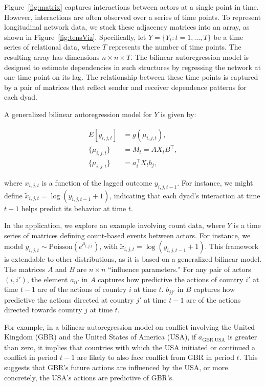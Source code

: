 Figure~\ref{fig:matrix} captures interactions between actors at a single point in time. However, interactions are often observed over a series of time points. To represent longitudinal network data, we stack these adjacency matrices into an array, as shown in Figure~\ref{fig:tensViz}. Specifically, let $Y = \{Y_t : t = 1, \ldots, T\}$ be a time series of relational data, where $T$ represents the number of time points. The resulting array has dimensions $n \times n \times T$. The bilinear autoregression model is designed to estimate dependencies in such structures by regressing the network at one time point on its lag. The relationship between these time points is captured by a pair of matrices that reflect sender and receiver dependence patterns for each dyad.

A generalized bilinear autoregression model for $Y$ is given by:

\begin{align*}
	E [ y_{i,j,t} ] &= g( \mu_{i,j,t} ), \\
	\{ \mu_{i,j,t} \} &= M_t = A X_t B^{\top}, \\
	\{ \mu_{i,j,t} \} & = a_i^{\top} X_{t} b_j,
\end{align*}

where $x_{i,j,t}$ is a function of the lagged outcome $y_{i,j,t-1}$. For instance, we might define 
$\tilde{x}_{i,j,t} = \log(y_{i,j,t-1} + 1)$, indicating that each dyad's interaction at time $t-1$ helps predict its behavior at time $t$. 

In the application, we explore an example involving count data, where $Y$ is a time series of matrices defining count-based events between actors. For instance, we model $ y_{i,j,t} \sim \text{Poisson}(e^{\mu_{i,j,t}})$, with $ \tilde{x}_{i,j,t} = \log(y_{i,j,t-1} + 1)$. This framework is extendable to other distributions, as it is based on a generalized bilinear model. The matrices $A$ and $B$ are $n \times n$ ``influence parameters." For any pair of actors $(i,i')$, the element $a_{ii'}$ in $A$ captures how predictive the actions of country $i'$ at time $t-1$ are of the actions of country $i$ at time $t$. $b_{jj'}$ in $B$ captures how predictive the actions directed at country $j'$ at time $t-1$ are of the actions directed towards country $j$ at time $t$.

For example, in a bilinear autoregression model on conflict involving the United Kingdom (GBR) and the United States of America (USA), if $ a_{\text{GBR}, \text{USA}} $ is greater than zero, it implies that countries with which the USA initiated or continued a conflict in period $t-1$ are likely to also face conflict from GBR in period $t$. This suggests that GBR's future actions are influenced by the USA, or more concretely, the USA's actions are predictive of GBR's.


